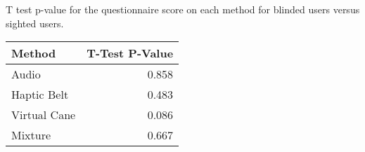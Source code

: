 
\centering
\caption{T test p-value for the questionnaire score on each method for blinded users versus sighted users.}
\label{tab:ttest_questionnaires}
\begin{tabular}{lr}
\toprule
      Method &  T-Test P-Value \\
\midrule
       Audio &           0.858 \\
 Haptic Belt &           0.483 \\
Virtual Cane &           0.086 \\
     Mixture &           0.667 \\
\bottomrule
\end{tabular}
